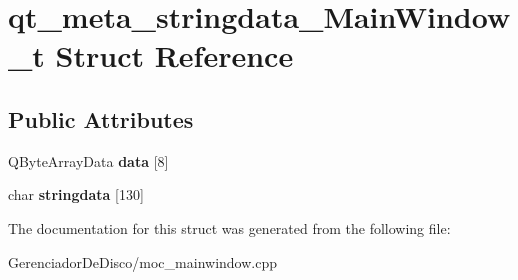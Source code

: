 \hypertarget{structqt__meta__stringdata__MainWindow__t}{\section{qt\+\_\+meta\+\_\+stringdata\+\_\+\+Main\+Window\+\_\+t Struct Reference}
\label{structqt__meta__stringdata__MainWindow__t}
}
\subsection*{Public Attributes}
\begin{DoxyCompactItemize}
\item 
\hypertarget{structqt__meta__stringdata__MainWindow__t_ae8888f3a82b4bd7597ba5dad592aeec6}{Q\+Byte\+Array\+Data {\bfseries data} \mbox{[}8\mbox{]}}\label{structqt__meta__stringdata__MainWindow__t_ae8888f3a82b4bd7597ba5dad592aeec6}

\item 
\hypertarget{structqt__meta__stringdata__MainWindow__t_a36f09c6ee58fefb768d55e0f8051d219}{char {\bfseries stringdata} \mbox{[}130\mbox{]}}\label{structqt__meta__stringdata__MainWindow__t_a36f09c6ee58fefb768d55e0f8051d219}

\end{DoxyCompactItemize}


The documentation for this struct was generated from the following file\+:\begin{DoxyCompactItemize}
\item 
Gerenciador\+De\+Disco/moc\+\_\+mainwindow.\+cpp\end{DoxyCompactItemize}
